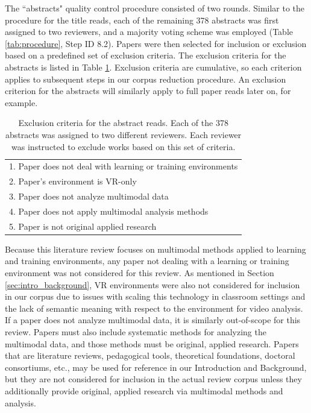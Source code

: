 \documentclass[manuscript,screen,review]{acmart}
\begin{document}
The ``abstracts" quality control procedure consisted of two rounds. Similar to the procedure for the title reads, each of the remaining 378 abstracts was first assigned to two reviewers, and a majority voting scheme was employed (Table \ref{tab:procedure}, Step ID 8.2). Papers were then selected for inclusion or exclusion based on a predefined set of exclusion criteria. The exclusion criteria for the abstracts is listed in Table \ref{tab:abstract_exclusion_criteria}. Exclusion criteria are cumulative, so each criterion applies to subsequent steps in our corpus reduction procedure. An exclusion criterion for the abstracts will similarly apply to full paper reads later on, for example.

\begin{table}[htbp]
    \renewcommand{\arraystretch}{1.3}%
    \centering
    \caption{Exclusion criteria for the abstract reads. Each of the 378 abstracts was assigned to two different reviewers. Each reviewer was instructed to exclude works based on this set of criteria.}
    \begin{tabularx}{\linewidth}{l@{\hskip .25in}}
        \midrule
        1. Paper does not deal with learning or training environments \\
        2. Paper's environment is VR-only \\
        3. Paper does not analyze multimodal data \\
        4. Paper does not apply multimodal analysis methods \\
        5. Paper is not original applied research\\
        \bottomrule
    \end{tabularx}
    \label{tab:abstract_exclusion_criteria}
\end{table}

Because this literature review focuses on multimodal methods applied to learning and training environments, any paper not dealing with a learning or training environment was not considered for this review. As mentioned in Section \ref{sec:intro_background}, VR environments were also not considered for inclusion in our corpus due to issues with scaling this technology in classroom settings and the lack of semantic meaning with respect to the environment for video analysis. If a paper does not analyze multimodal data, it is similarly out-of-scope for this review. Papers must also include systematic methods for analyzing the multimodal data, and those methods must be original, applied research. Papers that are literature reviews, pedagogical tools, theoretical foundations, doctoral consortiums, etc., may be used for reference in our Introduction and Background, but they are not considered for inclusion in the actual review corpus unless they additionally provide original, applied research via multimodal methods and analysis.
\end{document}
